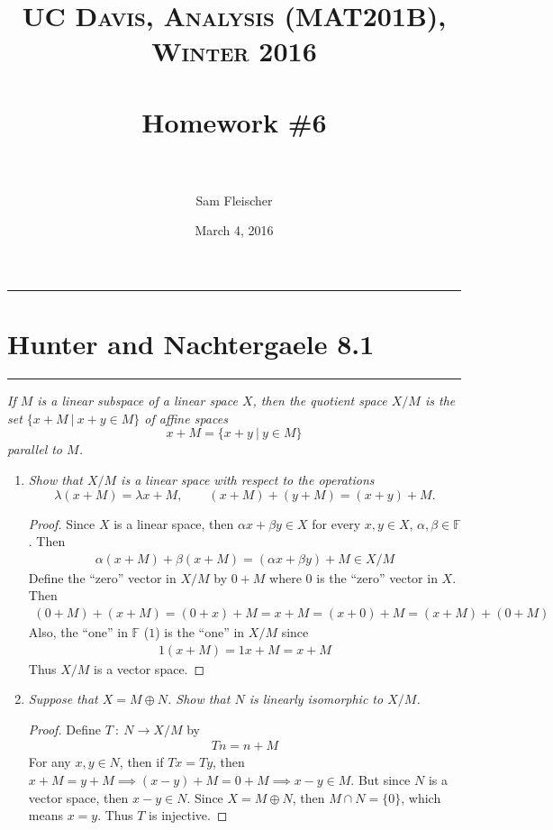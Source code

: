 \documentclass{article} %
\title{ 
\normalfont \normalsize 
\textsc{UC Davis, Analysis (MAT201B), Winter 2016} \\ [25pt] %
\horrule{2pt} \\[0.4cm] %
\Huge Homework \#6 \\ %
\horrule{2pt} \\[0.5cm] %
}
\author{\huge Sam Fleischer} %
\date{March 4, 2016} %
\theoremstyle{plain}
\newcommand{\problem}[1]{
\vspace{.375cm}
\begin{minipage}{\textwidth}
    \begin{center}
        \noindent\rule{5cm}{1pt}
    \end{center}
    \section{\bf #1}
    \begin{center}
        \noindent\rule{5cm}{1pt}
    \end{center}
    \vspace{0.25cm}
\end{minipage}
}
\numberwithin{equation}{section} %
\numberwithin{figure}{section} %
\numberwithin{table}{section} %
\begin{document}
\thispagestyle{empty}

\maketitle %

\makeatletter
{}
\makeatother

\pagebreak

\problem{Hunter and Nachtergaele 8.1}
\emph{If $M$ is a linear subspace of a linear space $X$, then the \emph{quotient space} $X/M$ is the set $\{x + M\ |\ x + y \in M\}$ of affine spaces $$x + M = \{x + y\ |\ y \in M\}$$ parallel to $M$.}
\begin{enumerate}[\it (a)]
    \item
        \emph{Show that $X/M$ is a linear space with respect to the operations $$\lambda(x + M) = \lambda x + M, \qquad (x + M) + (y + M) = (x + y) + M.$$}
        \begin{proof}
            Since $X$ is a linear space, then $\alpha x + \beta y \in X$ for every $x,y \in X$, $\alpha, \beta \in \mathbb{F}$.  Then
            \begin{align*}
                \alpha(x + M) + \beta(x + M) = (\alpha x + \beta y) + M \in X/M
            \end{align*}
            Define the ``zero'' vector in $X/M$ by $0 + M$ where $0$ is the ``zero'' vector in $X$.  Then
            \begin{align*}
                (0 + M) + (x + M) = (0 + x) + M = x + M = (x + 0) + M = (x + M) + (0 + M)
            \end{align*}
            Also, the ``one'' in $\mathbb{F}$ ($1$) is the ``one'' in $X/M$ since
            \begin{align*}
                1(x + M) = 1x + M = x + M
            \end{align*}
            Thus $X/M$ is a vector space.
        \end{proof}
    \item
        \emph{Suppose that $X = M \oplus N$.  Show that $N$ is linearly isomorphic to $X/M$.}
        \begin{proof}
            Define $T\ :\ N \rightarrow X/M$ by
            \begin{align*}
                Tn = n + M
            \end{align*}
            For any $x, y \in N$, then if $Tx = Ty$, then $x + M = y + M \implies (x - y) + M = 0 + M \implies x - y \in M$.  But since $N$ is a vector space, then $x - y \in N$.  Since $X = M \oplus N$, then $M \cap N = \{0\}$, which means $x = y$.  Thus $T$ is injective.

\end{proof}
\end{enumerate}
\end{document}
